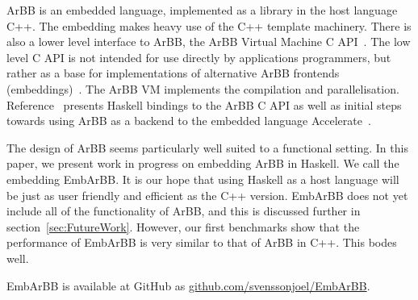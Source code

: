 


 

ArBB is an embedded language, implemented
as a library in the host language C++. The embedding makes 
heavy use of the C++ template machinery. There is also a lower level 
interface to ArBB, the ArBB Virtual Machine C API~\cite{arbbvm}. The low level C API is not
intended for use directly by applications programmers, but rather as a base 
for implementations of alternative ArBB frontends (embeddings)~\cite{ARBB2011}.
The ArBB VM implements the compilation and parallelisation.
Reference~\cite{joelryan} presents Haskell bindings to the ArBB C API as well as initial 
steps towards using ArBB as a backend to the embedded language Accelerate~\cite{accelerate}. 

The design of ArBB seems particularly well suited to a functional setting.
In this paper, we present work in progress on embedding ArBB in Haskell. We call the embedding EmbArBB.
It is our hope that using 
Haskell as a host language will be just as user friendly and efficient as 
the C++ version. EmbArBB does not yet include all of the functionality of ArBB,
and this is discussed further in section~\ref{sec:FutureWork}.
However,  our first benchmarks show that the performance of EmbArBB is very similar to that of ArBB in C++. This bodes well. 

EmbArBB is available at GitHub as 
\newline
\url{github.com/svenssonjoel/EmbArBB}.

